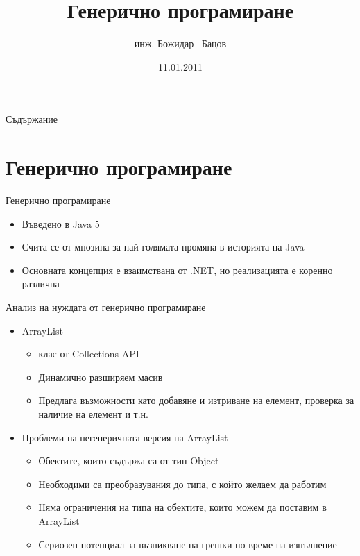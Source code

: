 \documentclass{beamer}
\title{Генерично програмиране}
\author{инж. Божидар ~Бацов}
\institute{Drow Ltd.}
\date{11.01.2011}
\begin{document}
\begin{frame}
  \titlepage
\end{frame}

\begin{frame}{Съдържание}
  \tableofcontents[pausesections]
\end{frame}

\section{Генерично програмиране}

\begin{frame}{Генерично програмиране}
  \begin{itemize}
  \item Въведено в Java 5
  \item Счита се от мнозина за най-голямата промяна в историята на
    Java
  \item Основната концепция е взаимствана от .NET, но реализацията е
    коренно различна
  \end{itemize}
\end{frame}

\begin{frame}{Анализ на нуждата от генерично програмиране}
  \transdissolve
  \begin{itemize}
  \item ArrayList
    \begin{itemize}
      \item клас от Collections API
      \item Динамично разширяем масив
      \item Предлага възможности като добавяне и изтриване на елемент,
        проверка за наличие на елемент и т.н.
    \end{itemize}
  \item Проблеми на негенеричната версия на ArrayList
    \begin{itemize}
      \item Обектите, които съдържа са от тип Object
      \item Необходими са преобразувания до типа, с който желаем да
        работим
      \item Няма ограничения на типа на обектите, които можем да
        поставим в ArrayList
      \item Сериозен потенциал за възникване на грешки по време на изпълнение
    \end{itemize}

  \end{itemize}
\end{frame}
\end{document}
